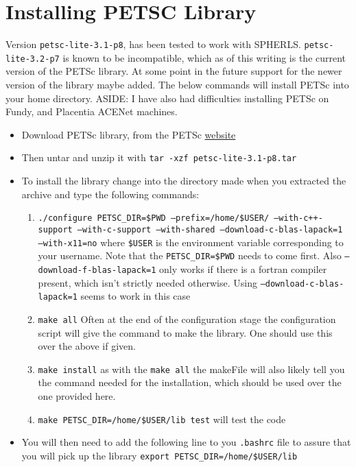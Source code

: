 \documentclass[12pt,a4paper]{book}
\begin{document}
\section{Installing PETSC Library}
Version {\tt petsc-lite-3.1-p8}, has been tested to work with SPHERLS. {\tt petsc-lite-3.2-p7} is known to be incompatible, which as of this writing is the current version of the PETSc library. At some point in the future support for the newer version of the library maybe added. The below commands will install PETSc into your home directory. ASIDE: I have also had difficulties installing PETSc on Fundy, and Placentia ACENet machines.

\begin{itemize}
\item Download PETSc library, from the PETSc \href{http://www.mcs.anl.gov/petsc/download/index.html}{website}
\item Then untar and unzip it with {\tt tar -xzf petsc-lite-3.1-p8.tar}
\item To install the library change into the directory made when you extracted the archive and type the following commands:
\begin{enumerate}
\item {\tt ./configure PETSC\_DIR=\$PWD --prefix=/home/\$USER/ --with-c++-support --with-c-support --with-shared --download-c-blas-lapack=1 --with-x11=no} where {\tt \$USER} is the environment variable corresponding to your username.  Note that the {\tt PETSC\_DIR=\$PWD} needs to come first. Also {\tt --download-f-blas-lapack=1} only works if there is a fortran compiler present, which isn't strictly needed otherwise. Using {\tt --download-c-blas-lapack=1} seems to work in this case
\item {\tt make all} Often at the end of the configuration stage the configuration script will give the command to make the library. One should use this over the above if given.
\item {\tt make install} as with the {\tt make all} the makeFile will also likely tell you the command needed for the installation, which should be used over the one provided here.
\item {\tt make PETSC\_DIR=/home/\$USER/lib test} will test the code
\end{enumerate}
\item You will then need to add the following line to you {\tt .bashrc} file to assure that you will pick up the library {\tt export PETSC\_DIR=/home/\$USER/lib}
\end{itemize}
\end{document}
